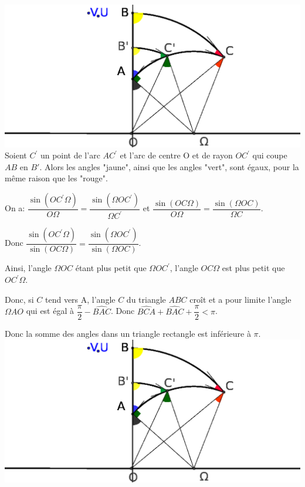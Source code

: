 \documentclass[a4paper, 12pt, twoside]{book}
\begin{document}
  
 
 \includegraphics[scale=0.7]{figures/hyper8.eps}\\
 
 Soient $C^{'}$ un point de l'arc $AC^{'}$ et l'arc de centre O et de rayon $OC^{'}$ qui coupe $AB$ en $B{'}$. Alors les angles "jaune", ainsi que les angles "vert", sont égaux, pour la même raison que les "rouge". \
 
 On a:  $\dfrac{\sin(OC^{'}\Omega)}{O\Omega}=\dfrac{\sin(\Omega OC^{'})}{\Omega C^{'}}$ et $\dfrac{\sin(OC\Omega)}{O\Omega}=\dfrac{\sin(\Omega OC)}{\Omega C}$. \
 
 Donc $\dfrac{\sin(OC^{'}\Omega)}{\sin(OC\Omega)}=\dfrac{\sin(\Omega OC^{'})}{\sin(\Omega OC)}$.\
 
 Ainsi, l'angle $\Omega OC$ étant plus petit que $\Omega OC^{'}$, l'angle $OC\Omega $ est plus petit que $OC^{'}\Omega $.\
 
 Donc, si $C$ tend vers A, l'angle $C$ du triangle $ABC$ croît et a pour limite l'angle $\Omega AO$ qui est égal à $\dfrac{\pi}{2}-\hat{BAC}$. Donc $\hat{BCA}+\hat{BAC}+\dfrac{\pi}{2}<\pi$.\
 
 Donc la somme des angles dans un triangle rectangle est inférieure à $\pi$.\\
 
 
  \includegraphics[scale=0.7]{figures/hyper8.eps}\\
  
\end{document}
